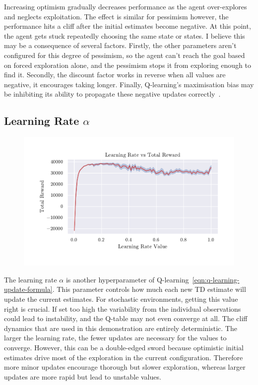 \documentclass[]{final_report}
\begin{document}
Increasing optimism gradually decreases performance as the agent over-explores and neglects exploitation. The effect is similar for pessimism however, the performance hits a cliff after the initial estimates become negative. At this point, the agent gets stuck repeatedly choosing the same state or states. I believe this may be a consequence of several factors. Firstly, the other parameters aren't configured for this degree of pessimism, so the agent can't reach the goal based on forced exploration alone, and the pessimism stops it from exploring enough to find it. Secondly, the discount factor works in reverse when all values are negative, it encourages taking longer. Finally, Q-learning's maximisation bias may be inhibiting its ability to propagate these negative updates correctly~\cite{doubleQLearning, sutton2018reinforcement}. 


\subsection{Learning Rate \texorpdfstring{$\alpha$}{Lg}}

\begin{figure}[H]
  \centering
  
  \includegraphics[trim={0 1cm 0 1cm},clip,width=\textwidth]{hyper-paramiters/learning-rate}
  
  \caption{\label{fig:learning-rate}}
\end{figure}

The learning rate $\alpha$ is another hyperparameter of Q-learning~\ref{eqn:q-learning-update-formula}. This parameter controls how much each new TD estimate will update the current estimates. For stochastic environments, getting this value right is crucial. If set too high the variability from the individual observations could lead to instability, and the Q-table may not even converge at all. The cliff dynamics that are used in this demonstration are entirely deterministic. The larger the learning rate, the fewer updates are necessary for the values to converge. However, this can be a double-edged sword because optimistic initial estimates drive most of the exploration in the current configuration. Therefore more minor updates encourage thorough but slower exploration, whereas larger updates are more rapid but lead to unstable values.
\end{document}
